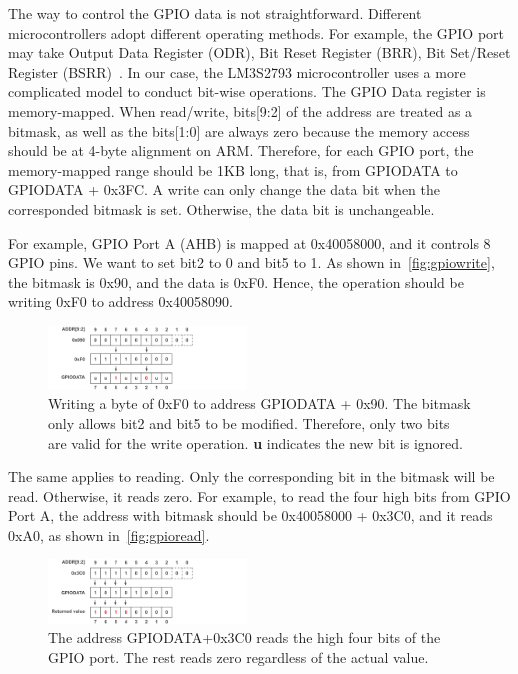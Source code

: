 The way to control the GPIO data is not straightforward.  Different microcontrollers adopt different operating methods. For example, the GPIO port may take Output Data Register (ODR), Bit Reset Register (BRR), Bit Set/Reset Register (BSRR)~\cite{cottle2001programmable}. In our case, the LM3S2793 microcontroller uses a more complicated model to conduct bit-wise operations. The GPIO Data register is memory-mapped. When read/write, bits[9:2] of the address are treated as a bitmask, as well as the bits[1:0] are always zero because the memory access should be at 4-byte alignment on ARM. Therefore, for each GPIO port, the memory-mapped range should be 1KB long, that is, from GPIODATA to GPIODATA + 0x3FC. A write can only change the data bit when the corresponded bitmask is set. Otherwise, the data bit is unchangeable.

For example, GPIO Port A (AHB) is mapped at 0x40058000, and it controls 8 GPIO pins. We want to set bit2 to 0 and bit5 to 1. As shown in~\autoref{fig:gpiowrite}, the bitmask is 0x90, and the data is 0xF0.  Hence, the operation should be writing 0xF0 to address 0x40058090.


\begin{figure}[th]
	\includegraphics[width=0.47\textwidth]{figures/gpiowrite2}
	\centering
	\caption{Writing a byte of 0xF0 to address GPIODATA + 0x90.  The bitmask only allows bit2 and bit5 to be modified. Therefore, only two bits are valid for the write operation.  \textbf{u} indicates the new bit is ignored.}
	\label{fig:gpiowrite}
\end{figure}



The same applies to reading. Only the corresponding bit in the bitmask will be read. Otherwise, it reads zero. For example, to read the four high bits from GPIO Port A, the address with bitmask should be 0x40058000 + 0x3C0, and it reads 0xA0, as shown in~\autoref{fig:gpioread}.

\begin{figure}[th]
	\includegraphics[width=0.47\textwidth]{figures/gpioread2}
	\centering
	\caption{The address GPIODATA+0x3C0 reads the high four bits of the GPIO port. The rest reads zero regardless of the actual value.}
	\label{fig:gpioread}
\end{figure}




